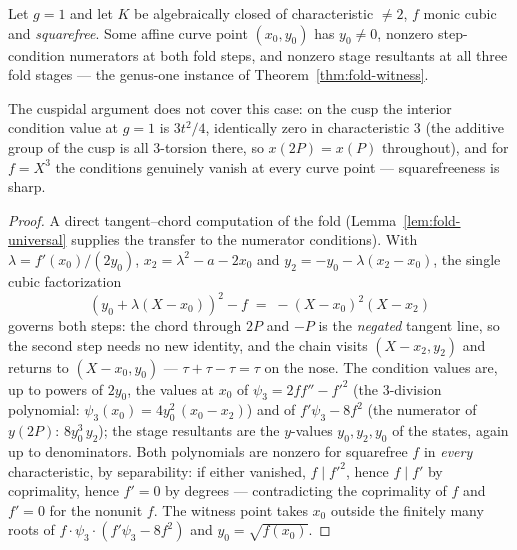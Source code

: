 \begin{lemma}
\label{lem:fold-witness-genus-one}
\leanok
{}
Let $g = 1$ and let $K$ be algebraically closed of characteristic $\neq 2$, $f$ monic
cubic and \emph{squarefree}. Some affine curve point $(x_0, y_0)$ has $y_0 \neq 0$,
nonzero step-condition numerators at both fold steps, and nonzero stage resultants at
all three fold stages --- the genus-one instance of Theorem~\ref{thm:fold-witness}.

The cuspidal argument does not cover this case: on the cusp the interior condition
value at $g = 1$ is $3t^2/4$, identically zero in characteristic $3$ (the additive
group of the cusp is all $3$-torsion there, so $x(2P) = x(P)$ throughout), and for
$f = X^3$ the conditions genuinely vanish at every curve point --- squarefreeness is
sharp.
\end{lemma}
\begin{proof}
\leanok
A direct tangent--chord computation of the fold
(Lemma~\ref{lem:fold-universal} supplies the transfer to the numerator conditions).
With $\lambda = f'(x_0)/(2y_0)$, $x_2 = \lambda^2 - a - 2x_0$ and
$y_2 = -y_0 - \lambda(x_2 - x_0)$, the single cubic factorization
\[ (y_0 + \lambda(X - x_0))^2 - f \;=\; -(X - x_0)^2 (X - x_2) \]
governs both steps: the chord through $2P$ and $-P$ is the \emph{negated} tangent line,
so the second step needs no new identity, and the chain visits $(X - x_2, y_2)$ and
returns to $(X - x_0, y_0)$ --- $\tau + \tau - \tau = \tau$ on the nose. The condition
values are, up to powers of $2y_0$, the values at $x_0$ of $\psi_3 = 2ff'' - f'^2$ (the
$3$-division polynomial: $\psi_3(x_0) = 4y_0^2\,(x_0 - x_2)$) and of
$f'\psi_3 - 8f^2$ (the numerator of $y(2P)$: $8y_0^3\,y_2$); the stage resultants are
the $y$-values $y_0, y_2, y_0$ of the states, again up to denominators. Both
polynomials are nonzero for squarefree $f$ in \emph{every} characteristic, by
separability: if either vanished, $f \mid f'^2$, hence $f \mid f'$ by coprimality,
hence $f' = 0$ by degrees --- contradicting the coprimality of $f$ and $f' = 0$ for the
nonunit $f$. The witness point takes $x_0$ outside the finitely many roots of
$f \cdot \psi_3 \cdot (f'\psi_3 - 8f^2)$ and $y_0 = \sqrt{f(x_0)}$.
\end{proof}

